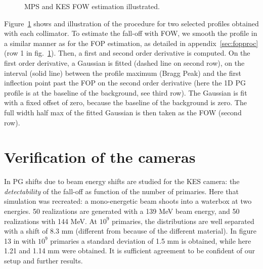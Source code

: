 \documentclass[a4paper,english]{article}
\begin{document}
\begin{figure}[htp]
  \centering
  \quad
  \caption{\label{FOWILLUS} MPS and KES FOW estimation illustrated.}
\end{figure}

Figure~\ref{FOWILLUS} shows and illustration of the procedure for two selected profiles obtained with each collimator. To estimate the fall-off with FOW, we smooth the profile in a similar manner as for the FOP estimation, as detailed in appendix~\ref{sec:fopproc} (row 1 in fig.~\ref{FOWILLUS}). Then, a first and second order derivative is computed. On the first order derivative, a Gaussian is fitted (dashed line on second row), on the interval (solid line) between the profile maximum (Bragg Peak) and the first inflection point past the FOP on the second order derivative (here the 1D PG profile is at the baseline of the background, see third row). The Gaussian is fit with a fixed offset of zero, because the baseline of the background is zero. The full width half max of the fitted Gaussian is then taken as the FOW (second row).


\section{Verification of the cameras}

In \cite{Priegnitz2015} PG shifts due to beam energy shifts are studied for the KES camera: the \emph{detectability} of the fall-off as function of the number of primaries. Here that simulation was recreated: a mono-energetic beam shoots into a waterbox at two energies. 50 realizations are generated with a 139 MeV beam energy, and 50 realizations with 144 MeV. At $10^9$ primaries, the distributions are well separated with a shift of 8.3 mm (different from \cite{Priegnitz2015} because of the different material). In figure 13 in \cite{Perali2014} with $10^9$ primaries a standard deviation of 1.5 mm is obtained, while here 1.21 and 1.14 mm were obtained. It is sufficient agreement to be confident of our setup and further results.
\end{document}
